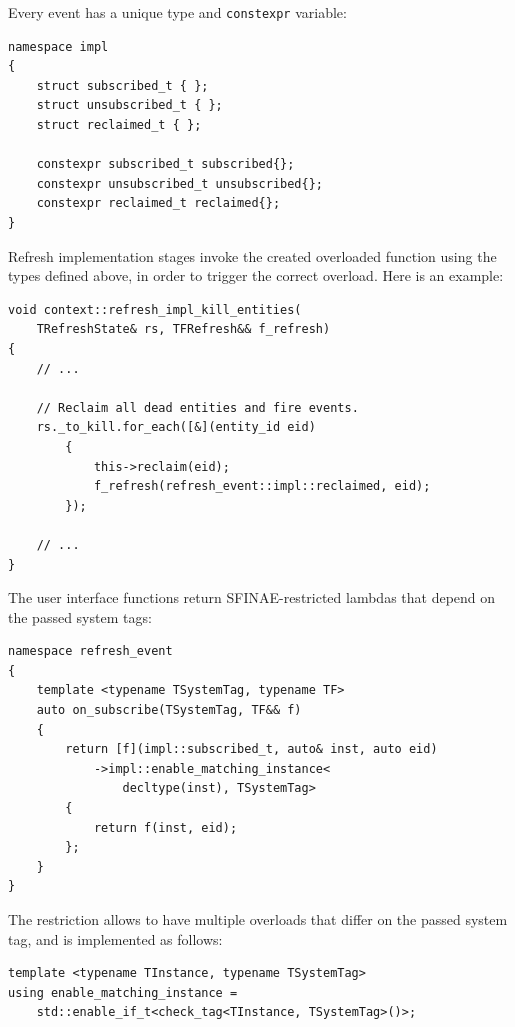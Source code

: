 \documentclass[twoside, 12pt, a4paper, openright]{book}
\begin{document}
Every event has a unique type and
\texttt{constexpr}
variable:

\begin{verbatim}
namespace impl
{
    struct subscribed_t { };
    struct unsubscribed_t { };
    struct reclaimed_t { };

    constexpr subscribed_t subscribed{};
    constexpr unsubscribed_t unsubscribed{};
    constexpr reclaimed_t reclaimed{};
}
\end{verbatim}

Refresh implementation stages invoke the created overloaded function
using the types defined above, in order to trigger the correct overload.
Here is an example:

\begin{verbatim}
void context::refresh_impl_kill_entities(
    TRefreshState& rs, TFRefresh&& f_refresh)
{
    // ...

    // Reclaim all dead entities and fire events.
    rs._to_kill.for_each([&](entity_id eid)
        {
            this->reclaim(eid);
            f_refresh(refresh_event::impl::reclaimed, eid);
        });

    // ...
}

\end{verbatim}

The user interface functions return SFINAE-restricted lambdas that
depend on the passed system tags:

\begin{verbatim}
namespace refresh_event
{
    template <typename TSystemTag, typename TF>
    auto on_subscribe(TSystemTag, TF&& f)
    {
        return [f](impl::subscribed_t, auto& inst, auto eid)
            ->impl::enable_matching_instance<
                decltype(inst), TSystemTag>
        {
            return f(inst, eid);
        };
    }
}
\end{verbatim}

The restriction allows to have multiple overloads that differ on the
passed system tag, and is implemented as follows:

\begin{verbatim}
template <typename TInstance, typename TSystemTag>
using enable_matching_instance =
    std::enable_if_t<check_tag<TInstance, TSystemTag>()>;
\end{verbatim}
\end{document}
